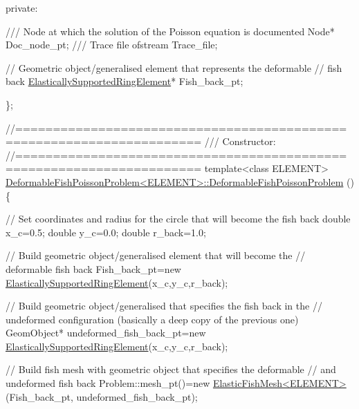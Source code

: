 \begin{DoxyCodeInclude}
\textcolor{keyword}{private}:

\textcolor{comment}{}
\textcolor{comment}{ /// Node at which the solution of the Poisson equation is documented}
\textcolor{comment}{} Node* Doc\_node\_pt;
\textcolor{comment}{}
\textcolor{comment}{ /// Trace file}
\textcolor{comment}{} ofstream Trace\_file;

 \textcolor{comment}{// Geometric object/generalised element that represents the deformable }
 \textcolor{comment}{// fish back}
 \hyperlink{classoomph_1_1ElasticallySupportedRingElement}{ElasticallySupportedRingElement}* Fish\_back\_pt;

\};



\textcolor{comment}{//====================================================================== }\textcolor{comment}{}
\textcolor{comment}{/// Constructor: }
\textcolor{comment}{}\textcolor{comment}{//====================================================================== }
\textcolor{keyword}{template}<\textcolor{keyword}{class} ELEMENT>
\hyperlink{classDeformableFishPoissonProblem_a383952a668f3cec16b85c6b35f437ddd}{DeformableFishPoissonProblem<ELEMENT>::DeformableFishPoissonProblem}
      () 
\{

 \textcolor{comment}{// Set coordinates and radius for the circle that will become the fish back}
 \textcolor{keywordtype}{double} x\_c=0.5;
 \textcolor{keywordtype}{double} y\_c=0.0;
 \textcolor{keywordtype}{double} r\_back=1.0;

 \textcolor{comment}{// Build geometric object/generalised element that will become the }
 \textcolor{comment}{// deformable fish back}
 Fish\_back\_pt=\textcolor{keyword}{new} \hyperlink{classoomph_1_1ElasticallySupportedRingElement}{ElasticallySupportedRingElement}(x\_c,y\_c,r\_back);

 \textcolor{comment}{// Build geometric object/generalised that specifies the fish back in the}
 \textcolor{comment}{// undeformed configuration (basically a deep copy of the previous one)}
 GeomObject* undeformed\_fish\_back\_pt=\textcolor{keyword}{new} 
  \hyperlink{classoomph_1_1ElasticallySupportedRingElement}{ElasticallySupportedRingElement}(x\_c,y\_c,r\_back);

 \textcolor{comment}{// Build fish mesh with geometric object that specifies the deformable}
 \textcolor{comment}{// and undeformed fish back }
 Problem::mesh\_pt()=\textcolor{keyword}{new} \hyperlink{classElasticFishMesh}{ElasticFishMesh<ELEMENT>}(Fish\_back\_pt,
                                                 undeformed\_fish\_back\_pt);



\end{DoxyCodeInclude}

